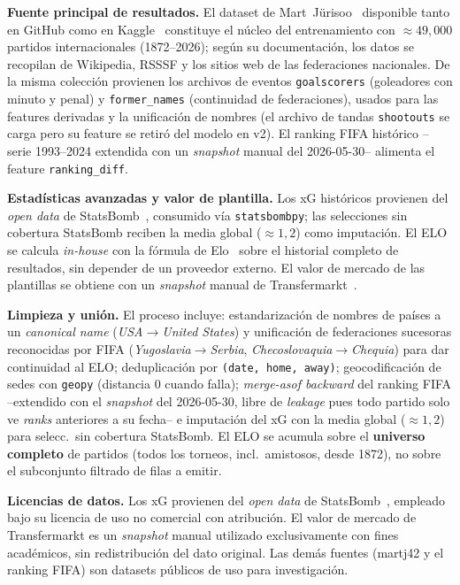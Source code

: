 \documentclass[conference]{IEEEtran}
\begin{document}
\textbf{Fuente principal de resultados.} El dataset de
Mart~J\"urisoo~\cite{martj42} disponible tanto en GitHub como en
Kaggle~\cite{kaggle_martj42} constituye el n\'ucleo del entrenamiento
con ${\approx}49{,}000$ partidos internacionales (1872--2026); seg\'un su
documentaci\'on, los datos se recopilan de Wikipedia, RSSSF y los sitios web de
las federaciones nacionales. De la misma colecci\'on provienen los archivos de
eventos \texttt{goalscorers} (goleadores con minuto y penal) y
\texttt{former\_names} (continuidad de federaciones), usados para las
features derivadas y la unificaci\'on de nombres (el archivo de tandas
\texttt{shootouts} se carga pero su feature se retir\'o del modelo en v2). El ranking FIFA hist\'orico
\cite{kaggle_fifaranking} --serie 1993--2024 extendida con un \emph{snapshot}
manual del 2026-05-30-- alimenta el feature \texttt{ranking\_diff}.

\textbf{Estad\'isticas avanzadas y valor de plantilla.} Los xG hist\'oricos
provienen del \emph{open data} de StatsBomb~\cite{statsbomb}, consumido v\'ia
\texttt{statsbombpy}; las selecciones sin cobertura StatsBomb reciben la media
global (${\approx}1{,}2$) como imputaci\'on. El ELO se calcula \emph{in-house}
con la f\'ormula de Elo~\cite{elo1978} sobre el historial completo de
resultados, sin depender de un proveedor externo. El valor de mercado de las
plantillas se obtiene con un \emph{snapshot} manual de
Transfermarkt~\cite{transfermarkt}.

\textbf{Limpieza y uni\'on.} El proceso incluye: estandarizaci\'on de
nombres de pa\'ises a un \emph{canonical name} (\textit{USA}$\to$\textit{United
  States}) y unificaci\'on de federaciones sucesoras reconocidas por FIFA
(\textit{Yugoslavia}$\to$\textit{Serbia}, \textit{Checoslovaquia}$\to$\textit{Chequia})
para dar continuidad al ELO; deduplicaci\'on por \texttt{(date, home, away)};
geocodificaci\'on de sedes con \texttt{geopy} (distancia $0$ cuando falla);
\emph{merge-asof backward} del ranking FIFA --extendido con el \emph{snapshot}
del 2026-05-30, libre de \emph{leakage} pues todo partido solo ve \emph{ranks}
anteriores a su fecha-- e imputaci\'on del xG con la media global
(${\approx}1{,}2$) para selecc.\ sin cobertura StatsBomb. El ELO se acumula
sobre el \textbf{universo completo} de partidos (todos los torneos, incl.\
amistosos, desde 1872), no sobre el subconjunto filtrado de filas a emitir.

\textbf{Licencias de datos.} Los xG provienen del \emph{open data} de
StatsBomb~\cite{statsbomb}, empleado bajo su licencia de uso no
comercial con atribuci\'on. El valor de mercado de Transfermarkt
\cite{transfermarkt} es un \emph{snapshot} manual utilizado
exclusivamente con fines acad\'emicos, sin redistribuci\'on del dato
original. Las dem\'as fuentes (martj42 y el ranking FIFA) son datasets
p\'ublicos de uso para investigaci\'on.
\end{document}

